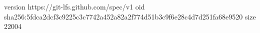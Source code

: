 version https://git-lfs.github.com/spec/v1
oid sha256:5fdca2dcf3c9225c3c7742a452a82a2f774d51b3c9f6e28c4d7d251fa68e9520
size 22004
